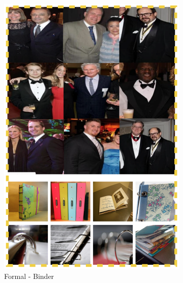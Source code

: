 \documentclass[10pt,twocolumn,letterpaper]{article}
\begin{document}
\begin{figure}[!t]
\begin{center}
        \begin{subfigure}[b]{0.2\textwidth}
                \includegraphics[width=\textwidth]{feature1}
                \caption{Formal - Binder}
                \label{feature1}
        \end{subfigure}
                \begin{subfigure}[b]{0.2\textwidth}

\end{subfigure}
\end{center}
\end{figure}
\end{document}
